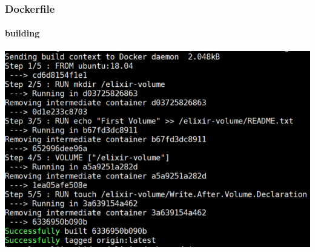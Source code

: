 \begin{frame}
\frametitle{Dockerfile}
\framesubtitle{building}

\includegraphics[width=0.8\columnwidth]{./Figure/BuildingDockerfile}
\end{frame}

